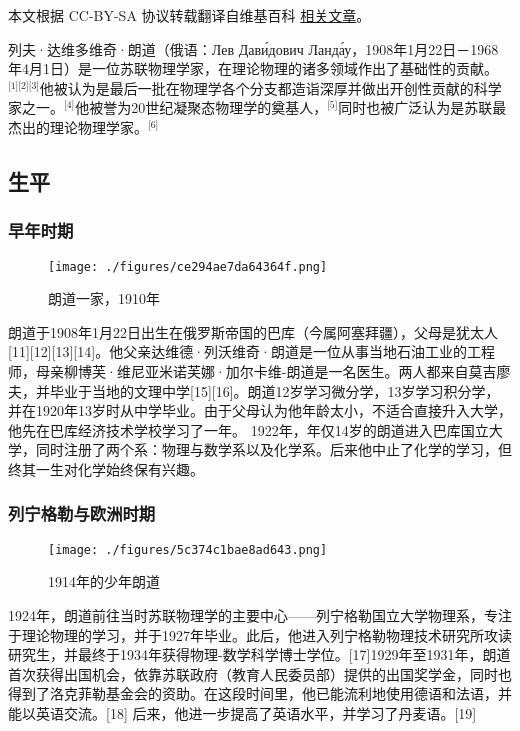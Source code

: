 
本文根据 CC-BY-SA 协议转载翻译自维基百科 \href{https://en.wikipedia.org/wiki/Lev_Landau}{相关文章}。

列夫·达维多维奇·朗道（俄语：Лев Дави́дович Ланда́у，1908年1月22日－1968年4月1日）是一位苏联物理学家，在理论物理的诸多领域作出了基础性的贡献。\(^\text{[1][2][3]}\)他被认为是最后一批在物理学各个分支都造诣深厚并做出开创性贡献的科学家之一。\(^\text{[4]}\)他被誉为20世纪凝聚态物理学的奠基人，\(^\text{[5]}\)同时也被广泛认为是苏联最杰出的理论物理学家。\(^\text{[6]}\)
\subsection{生平}
\subsubsection{早年时期}
\begin{figure}[ht]
\centering
\texttt{[image: ./figures/ce294ae7da64364f.png]}
\caption{朗道一家，1910年} \label{fig_LFLD_1}
\end{figure}
朗道于1908年1月22日出生在俄罗斯帝国的巴库（今属阿塞拜疆），父母是犹太人[11][12][13][14]。他父亲达维德·列沃维奇·朗道是一位从事当地石油工业的工程师，母亲柳博芙·维尼亚米诺芙娜·加尔卡维-朗道是一名医生。两人都来自莫吉廖夫，并毕业于当地的文理中学[15][16]。朗道12岁学习微分学，13岁学习积分学，并在1920年13岁时从中学毕业。由于父母认为他年龄太小，不适合直接升入大学，他先在巴库经济技术学校学习了一年。
1922年，年仅14岁的朗道进入巴库国立大学，同时注册了两个系：物理与数学系以及化学系。后来他中止了化学的学习，但终其一生对化学始终保有兴趣。
\subsubsection{列宁格勒与欧洲时期}
\begin{figure}[ht]
\centering
\texttt{[image: ./figures/5c374c1bae8ad643.png]}
\caption{1914年的少年朗道} \label{fig_LFLD_2}
\end{figure}
1924年，朗道前往当时苏联物理学的主要中心——列宁格勒国立大学物理系，专注于理论物理的学习，并于1927年毕业。此后，他进入列宁格勒物理技术研究所攻读研究生，并最终于1934年获得物理-数学科学博士学位。[17]1929年至1931年，朗道首次获得出国机会，依靠苏联政府（教育人民委员部）提供的出国奖学金，同时也得到了洛克菲勒基金会的资助。在这段时间里，他已能流利地使用德语和法语，并能以英语交流。[18] 后来，他进一步提高了英语水平，并学习了丹麦语。[19]

